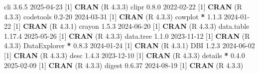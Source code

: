 \documentclass[
]{article}
\newenvironment{Shaded}{\begin{snugshade}}{\end{snugshade}}
\newcommand{\DecValTok}[1]{\textcolor[rgb]{0.00,0.00,0.81}{#1}}
\newcommand{\FloatTok}[1]{\textcolor[rgb]{0.00,0.00,0.81}{#1}}
\newcommand{\FunctionTok}[1]{\textcolor[rgb]{0.13,0.29,0.53}{\textbf{#1}}}
\newcommand{\NormalTok}[1]{#1}
\newcommand{\SpecialCharTok}[1]{\textcolor[rgb]{0.81,0.36,0.00}{\textbf{#1}}}
\begin{document}
\begin{Shaded}
\begin{Highlighting}[]
\NormalTok{ cli             }\DecValTok{3}\NormalTok{.}\FloatTok{6.5}   \DecValTok{2025{-}04{-}23}\NormalTok{ [}\DecValTok{1}\NormalTok{] }\FunctionTok{CRAN}\NormalTok{ (R }\DecValTok{4}\NormalTok{.}\FloatTok{3.3}\NormalTok{)}
\NormalTok{ clipr           }\DecValTok{0}\NormalTok{.}\FloatTok{8.0}   \DecValTok{2022{-}02{-}22}\NormalTok{ [}\DecValTok{1}\NormalTok{] }\FunctionTok{CRAN}\NormalTok{ (R }\DecValTok{4}\NormalTok{.}\FloatTok{3.3}\NormalTok{)}
\NormalTok{ codetools       }\FloatTok{0.2}\DecValTok{{-}20}  \DecValTok{2024{-}03{-}31}\NormalTok{ [}\DecValTok{1}\NormalTok{] }\FunctionTok{CRAN}\NormalTok{ (R }\DecValTok{4}\NormalTok{.}\FloatTok{3.3}\NormalTok{)}
\NormalTok{ cowplot       }\SpecialCharTok{*} \DecValTok{1}\NormalTok{.}\FloatTok{1.3}   \DecValTok{2024{-}01{-}22}\NormalTok{ [}\DecValTok{1}\NormalTok{] }\FunctionTok{CRAN}\NormalTok{ (R }\DecValTok{4}\NormalTok{.}\FloatTok{3.1}\NormalTok{)}
\NormalTok{ crayon          }\DecValTok{1}\NormalTok{.}\FloatTok{5.3}   \DecValTok{2024{-}06{-}20}\NormalTok{ [}\DecValTok{1}\NormalTok{] }\FunctionTok{CRAN}\NormalTok{ (R }\DecValTok{4}\NormalTok{.}\FloatTok{3.3}\NormalTok{)}
\NormalTok{ data.table      }\DecValTok{1}\NormalTok{.}\FloatTok{17.4}  \DecValTok{2025{-}05{-}26}\NormalTok{ [}\DecValTok{1}\NormalTok{] }\FunctionTok{CRAN}\NormalTok{ (R }\DecValTok{4}\NormalTok{.}\FloatTok{3.3}\NormalTok{)}
\NormalTok{ data.tree       }\DecValTok{1}\NormalTok{.}\FloatTok{1.0}   \DecValTok{2023{-}11{-}12}\NormalTok{ [}\DecValTok{1}\NormalTok{] }\FunctionTok{CRAN}\NormalTok{ (R }\DecValTok{4}\NormalTok{.}\FloatTok{3.3}\NormalTok{)}
\NormalTok{ DataExplorer  }\SpecialCharTok{*} \DecValTok{0}\NormalTok{.}\FloatTok{8.3}   \DecValTok{2024{-}01{-}24}\NormalTok{ [}\DecValTok{1}\NormalTok{] }\FunctionTok{CRAN}\NormalTok{ (R }\DecValTok{4}\NormalTok{.}\FloatTok{3.1}\NormalTok{)}
\NormalTok{ DBI             }\DecValTok{1}\NormalTok{.}\FloatTok{2.3}   \DecValTok{2024{-}06{-}02}\NormalTok{ [}\DecValTok{1}\NormalTok{] }\FunctionTok{CRAN}\NormalTok{ (R }\DecValTok{4}\NormalTok{.}\FloatTok{3.3}\NormalTok{)}
\NormalTok{ desc            }\DecValTok{1}\NormalTok{.}\FloatTok{4.3}   \DecValTok{2023{-}12{-}10}\NormalTok{ [}\DecValTok{1}\NormalTok{] }\FunctionTok{CRAN}\NormalTok{ (R }\DecValTok{4}\NormalTok{.}\FloatTok{3.3}\NormalTok{)}
\NormalTok{ details       }\SpecialCharTok{*} \DecValTok{0}\NormalTok{.}\FloatTok{4.0}   \DecValTok{2025{-}02{-}09}\NormalTok{ [}\DecValTok{1}\NormalTok{] }\FunctionTok{CRAN}\NormalTok{ (R }\DecValTok{4}\NormalTok{.}\FloatTok{3.3}\NormalTok{)}
\NormalTok{ digest          }\DecValTok{0}\NormalTok{.}\FloatTok{6.37}  \DecValTok{2024{-}08{-}19}\NormalTok{ [}\DecValTok{1}\NormalTok{] }\FunctionTok{CRAN}\NormalTok{ (R }\DecValTok{4}\NormalTok{.}\FloatTok{3.3}\NormalTok{)}

\end{Highlighting}
\end{Shaded}
\end{document}
